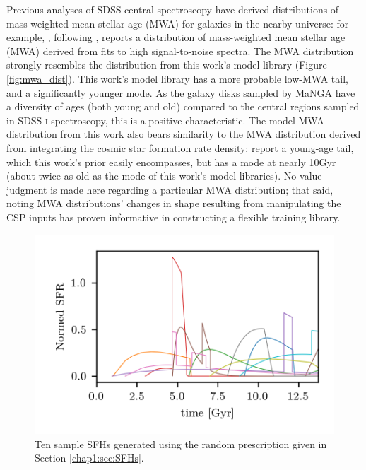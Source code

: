 Previous analyses of SDSS central spectroscopy have derived distributions of mass-weighted mean stellar age (MWA) for galaxies in the nearby universe: for example, \citet{gallazzi_charlot_05}, following \citet{kauffmann_heckman_white_03}, reports a distribution of mass-weighted mean stellar age (MWA) derived from fits to high signal-to-noise spectra. The \citet{gallazzi_charlot_05} MWA distribution strongly resembles the distribution from this work's model library (Figure \ref{fig:mwa_dist}). This work's model library has a more probable low-MWA tail, and a significantly younger mode. As the galaxy disks sampled by MaNGA have a diversity of ages (both young and old) compared to the central regions sampled in \textsc{SDSS-i} spectroscopy, this is a positive characteristic. The model MWA distribution from this work also bears similarity to the MWA distribution derived from integrating the \citet{madau_dickinson_2014_csfrd} cosmic star formation rate density: \citet{madau_dickinson_2014_csfrd} report a young-age tail, which this work's prior easily encompasses, but has a mode at nearly 10Gyr (about twice as old as the mode of this work's model libraries). No value judgment is made here regarding a particular MWA distribution; that said, noting MWA distributions' changes in shape resulting from manipulating the CSP inputs has proven informative in constructing a flexible training library.

\begin{figure}
    \centering
    \includegraphics[width=\columnwidth]{randomSFHs}
    \caption[Ten sample SFHs]{\fixspacing Ten sample SFHs generated using the random prescription given in Section \ref{chap1:sec:SFHs}.}
    \label{fig:sample_sfhs}
\end{figure}

